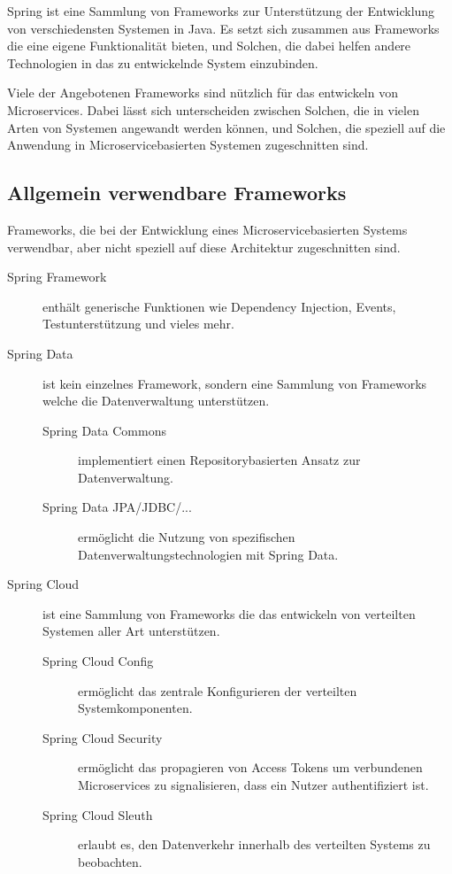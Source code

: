 \documentclass{article}
\begin{document}
Spring ist eine Sammlung von Frameworks zur Unterstützung der Entwicklung von verschiedensten Systemen in Java.
Es setzt sich zusammen aus Frameworks die eine eigene Funktionalität bieten, und Solchen, die dabei helfen andere Technologien in das zu entwickelnde System einzubinden.

Viele der Angebotenen Frameworks sind nützlich für das entwickeln von Microservices.
Dabei lässt sich unterscheiden zwischen Solchen, die in vielen Arten von Systemen angewandt werden können, und Solchen, die speziell auf die Anwendung in Microservicebasierten Systemen zugeschnitten sind.

\subsection{Allgemein verwendbare Frameworks}

Frameworks, die bei der Entwicklung eines Microservicebasierten Systems verwendbar, aber nicht speziell auf diese Architektur zugeschnitten sind.

\begin{description}
    \item[Spring Framework] enthält generische Funktionen wie Dependency Injection, Events, Testunterstützung und vieles mehr.
    \item[Spring Data] ist kein einzelnes Framework, sondern eine Sammlung von Frameworks welche die Datenverwaltung unterstützen.
    \begin{description}
        \item[Spring Data Commons] implementiert einen Repositorybasierten Ansatz zur Datenverwaltung.
        \item[Spring Data JPA/JDBC/...] ermöglicht die Nutzung von spezifischen Datenverwaltungstechnologien mit Spring Data.
    \end{description}

    \item[Spring Cloud] ist eine Sammlung von Frameworks die das entwickeln von verteilten Systemen aller Art unterstützen.
    \begin{description}
        \item[Spring Cloud Config] ermöglicht das zentrale Konfigurieren der verteilten Systemkomponenten.
        \item[Spring Cloud Security] ermöglicht das propagieren von Access Tokens um verbundenen Microservices zu signalisieren, dass ein Nutzer authentifiziert ist.
        \item[Spring Cloud Sleuth] erlaubt es, den Datenverkehr innerhalb des verteilten Systems zu beobachten.
    \end{description}
\end{description}
\end{document}
